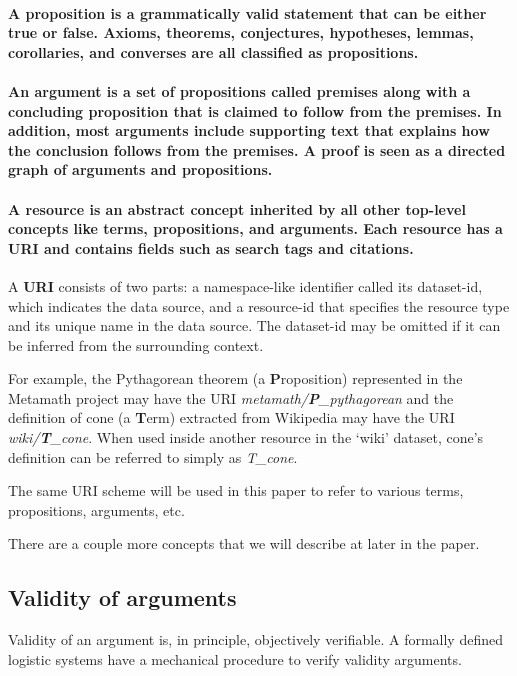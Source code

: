 \documentclass[a4paper]{article}
\begin{document}
\paragraph{A \textbf{proposition} is a grammatically valid statement that can be either true or false. Axioms, theorems, conjectures, hypotheses, lemmas, corollaries, and converses are all classified as propositions.}

\paragraph{An \textbf{argument} is a set of propositions called premises along with a concluding proposition that is claimed to follow from the premises. In addition, most arguments include supporting text that explains how the conclusion follows from the premises. A proof is seen as a directed graph of arguments and propositions.}

\paragraph{A \textbf{resource} is an abstract concept inherited by all other top-level concepts like terms, propositions, and arguments. Each resource has a URI and contains fields such as search tags and citations.}

A \textbf{URI} consists of two parts: a namespace-like identifier called its dataset-id, which indicates the data source, and a resource-id that specifies the resource type and its unique name in the data source. The dataset-id may be omitted if it can be inferred from the surrounding context.

For example, the Pythagorean theorem (a \textbf{P}roposition) represented in the Metamath project may have the URI \emph{metamath/\textbf{P}\_pythagorean} and the definition of cone (a \textbf{T}erm) extracted from Wikipedia may have the URI \emph{wiki/\textbf{T}\_cone}. When used inside another resource in the `wiki' dataset, cone's definition can be referred to simply as \emph{T\_cone}.

The same URI scheme will be used in this paper to refer to various terms, propositions, arguments, etc.

There are a couple more concepts that we will describe at later in the paper.


\subsection{Validity of arguments}
Validity of an argument is, in principle, objectively verifiable. A formally defined logistic systems have a mechanical procedure to verify validity arguments.
\end{document}
